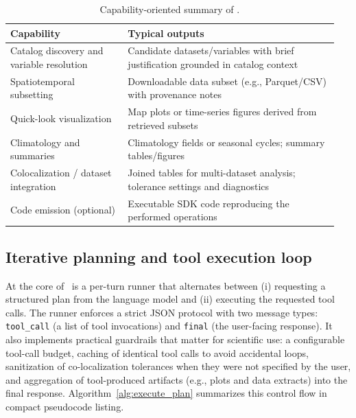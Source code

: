 \begin{table}[h]
\centering
\small
\begin{tabular}{@{}p{0.34\linewidth}p{0.61\linewidth}@{}}
\toprule
\textbf{Capability} & \textbf{Typical outputs} \\
\midrule
Catalog discovery and variable resolution & Candidate datasets/variables with brief justification grounded in catalog context \\
Spatiotemporal subsetting & Downloadable data subset (e.g., Parquet/CSV) with provenance notes \\
Quick-look visualization & Map plots or time-series figures derived from retrieved subsets \\
Climatology and summaries & Climatology fields or seasonal cycles; summary tables/figures \\
Colocalization / dataset integration & Joined tables for multi-dataset analysis; tolerance settings and diagnostics \\
Code emission (optional) & Executable SDK code reproducing the performed operations \\
\bottomrule
\end{tabular}
\caption{Capability-oriented summary of \cmapagent.}
\label{tab:capabilities}
\end{table}

\subsection{Iterative planning and tool execution loop}
At the core of \cmapagent\ is a per-turn runner that alternates between (i) requesting a structured plan from the language model and (ii) executing the requested tool calls.
The runner enforces a strict JSON protocol with two message types: \texttt{tool\_call} (a list of tool invocations) and \texttt{final} (the user-facing response).
It also implements practical guardrails that matter for scientific use: a configurable tool-call budget, caching of identical tool calls to avoid accidental loops, sanitization of co-localization tolerances when they were not specified by the user, and aggregation of tool-produced artifacts (e.g., plots and data extracts) into the final response.
Algorithm~\ref{alg:execute_plan} summarizes this control flow in compact pseudocode listing.

